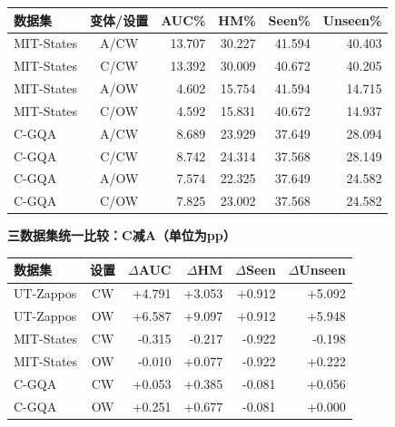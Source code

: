 \documentclass[12pt,a4paper,UTF8]{ctexart}
\newenvironment{reporttable}{\par\smallskip\begingroup\small\centering}{\par\endgroup\smallskip}
\begin{document}
\begin{reporttable}

\begin{tabularx}{\linewidth}{|Y|c|r|r|r|r|}
\hline

\textbf{数据集} & \textbf{变体/设置} & \textbf{AUC\%} & \textbf{HM\%} & \textbf{Seen\%} & \textbf{Unseen\%} \\ \hline

MIT-States & A/CW & 13.707 & 30.227 & 41.594 & 40.403 \\ \hline

MIT-States & C/CW & 13.392 & 30.009 & 40.672 & 40.205 \\ \hline

MIT-States & A/OW & 4.602 & 15.754 & 41.594 & 14.715 \\ \hline

MIT-States & C/OW & 4.592 & 15.831 & 40.672 & 14.937 \\ \hline

C-GQA & A/CW & 8.689 & 23.929 & 37.649 & 28.094 \\ \hline

C-GQA & C/CW & 8.742 & 24.314 & 37.568 & 28.149 \\ \hline

C-GQA & A/OW & 7.574 & 22.325 & 37.649 & 24.582 \\ \hline

C-GQA & C/OW & 7.825 & 23.002 & 37.568 & 24.582 \\ \hline

\end{tabularx}\end{reporttable}

\noindent\textbf{三数据集统一比较：C减A（单位为pp）}

\begin{reporttable}

\begin{tabularx}{\linewidth}{|Y|c|r|r|r|r|}
\hline

\textbf{数据集} & \textbf{设置} & \textbf{$\Delta$AUC} & \textbf{$\Delta$HM} & \textbf{$\Delta$Seen} & \textbf{$\Delta$Unseen} \\ \hline

UT-Zappos & CW & +4.791 & +3.053 & +0.912 & +5.092 \\ \hline

UT-Zappos & OW & +6.587 & +9.097 & +0.912 & +5.948 \\ \hline

MIT-States & CW & -0.315 & -0.217 & -0.922 & -0.198 \\ \hline

MIT-States & OW & -0.010 & +0.077 & -0.922 & +0.222 \\ \hline

C-GQA & CW & +0.053 & +0.385 & -0.081 & +0.056 \\ \hline

C-GQA & OW & +0.251 & +0.677 & -0.081 & +0.000 \\ \hline

\end{tabularx}\end{reporttable}
\end{document}
